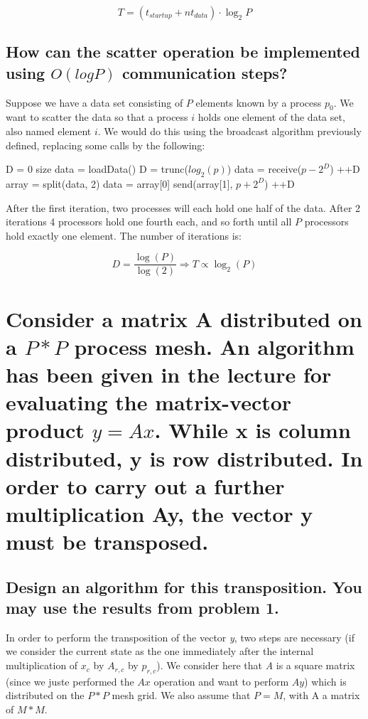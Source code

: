 \[T = (t_{startup}+nt_{data} )\cdot \log_2{P}   \]

\subsection{How can the scatter operation be implemented using $O(logP)$ communication steps?}
Suppose we have a data set consisting of $P$ elements known by a process $p_0$. We want to scatter the data so that a process $i$ holds one element of the data set, also named element $i$. We would do this using the broadcast algorithm previously defined, replacing some calls by the following:

\begin{algorithmic}
    \State D = 0 size
    \State data = loadData()
\Else
    \State D = trunc($log_2(p)$) 
    \State data = receive($p - 2^D$)
    \State ++D
\EndIf
\State 
{}
    \State array = split(data, 2) 
    \State data = array[0]
    \State send(array[1], $p + 2^D$)
    \State ++D
\EndWhile
\end{algorithmic}

After the first iteration, two processes will each hold one half of the data. After 2 iterations 4 processors hold one fourth each, and so forth until all $P$ processors hold exactly one element. The number of iterations is:

\[ D = \frac{\log(P)}{\log(2)} \Rightarrow T \propto \log_2(P) \]

\section{Consider a matrix A distributed on a $P*P$ process mesh. An algorithm has been given in the lecture for evaluating the matrix-vector product $y = Ax$. While x is column distributed, y is row distributed. In order to carry out a further multiplication Ay, the vector y must be transposed.}
\subsection{Design an algorithm for this transposition. You may use the results from
problem 1.}

In order to perform the transposition of the vector \textit{y}, two steps are necessary (if we consider the current state as the one immediately after the internal multiplication of $x_c$ by $A_{r,c}$ by $p_{r,c}$). We consider here that \textit{A} is a square matrix (since we juste performed the $Ax$ operation and want to perform $Ay$) which is distributed on the $P*P$ mesh grid. We also assume that $P = M$, with A a matrix of $M*M$.

